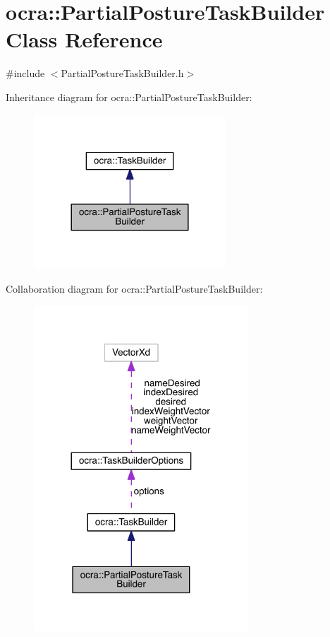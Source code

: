 \hypertarget{classocra_1_1PartialPostureTaskBuilder}{}\section{ocra\+:\+:Partial\+Posture\+Task\+Builder Class Reference}
\label{classocra_1_1PartialPostureTaskBuilder}


{\ttfamily \#include $<$Partial\+Posture\+Task\+Builder.\+h$>$}



Inheritance diagram for ocra\+:\+:Partial\+Posture\+Task\+Builder\+:\nopagebreak
\begin{figure}[H]
\begin{center}
\leavevmode
\includegraphics[width=204pt]{d1/d8b/classocra_1_1PartialPostureTaskBuilder__inherit__graph}
\end{center}
\end{figure}


Collaboration diagram for ocra\+:\+:Partial\+Posture\+Task\+Builder\+:\nopagebreak
\begin{figure}[H]
\begin{center}
\leavevmode
\includegraphics[width=228pt]{d6/d95/classocra_1_1PartialPostureTaskBuilder__coll__graph}
\end{center}
\end{figure}
